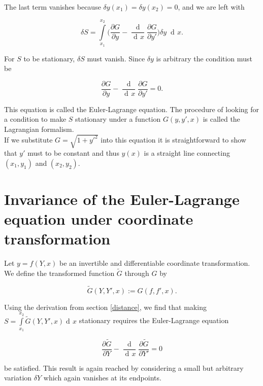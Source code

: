 \documentclass{article}
\DeclareMathOperator{\dd}{d\!}
\DeclareMathOperator{\ddd}{\mathrm{d}}
\begin{document}
The last term vanishes because $\delta y(x_1) = \delta y(x_2) = 0$, and we are left with


\begin{equation}
\delta S = \int\limits_{x_1}^{x_2} \bigg( \frac{\partial G}{\partial y}
- \frac{\ddd}{\dd x}\frac{\partial G}{\partial y'} \bigg) \delta y \; \dd x.
\end{equation}

For $S$ to be stationary, $\delta S$ must vanish. Since $\delta y$ is arbitrary the condition must be


\begin{equation}\label{e-l}
\frac{\partial G}{\partial y} - \frac{\ddd}{\dd x}\frac{\partial G}{\partial y'} = 0.
\end{equation}

This equation is called the Euler-Lagrange equation. The procedure of looking for a condition to make $S$ stationary under a function $G(y,y',x)$ is called the Lagrangian formalism.\\

If we substitute $G = \sqrt{1+y'^2}$ into this equation it is straightforward to show that $y'$ must to be constant and thus $y(x)$ is a straight line connecting $(x_1,y_1)$ and $(x_2,y_2)$.

\section{Invariance of the Euler-Lagrange equation under coordinate transformation \cite{Kleinert}}

Let $y=f(Y,x)$ be an invertible and differentiable coordinate transformation. We define the transformed function $\widetilde{G}$ through $G$ by

\begin{equation}
\widetilde{G}(Y,Y',x) := G(f,f',x).
\end{equation}

Using the derivation from section \ref{distance}, we find that making $S = \int\limits_{x_1}^{x_2} \widetilde{G}(Y,Y',x) \dd x$ stationary requires the Euler-Lagrange equation

\begin{equation}
\frac{\partial \widetilde{G}}{\partial Y}
- \frac{\ddd}{\dd x}\frac{\partial \widetilde{G}}{\partial Y'} = 0
\end{equation}

be satisfied. This result is again reached by considering a small but arbitrary variation $\delta Y$ which again vanishes at its endpoints.\\
\end{document}
